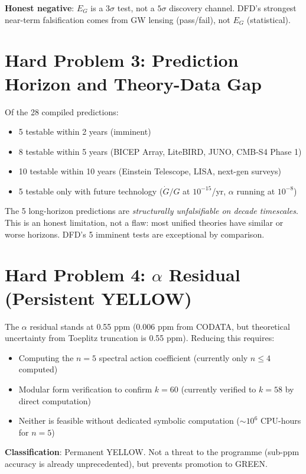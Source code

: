 \documentclass[11pt,a4paper]{article}
\begin{document}
\textbf{Honest negative}: $E_G$ is a $3\sigma$ test, not a $5\sigma$ discovery channel. DFD's strongest near-term falsification comes from GW lensing (pass/fail), not $E_G$ (statistical).

\section{Hard Problem 3: Prediction Horizon and Theory-Data Gap}

Of the 28 compiled predictions:
\begin{itemize}[nosep]
\item 5 testable within 2 years (imminent)
\item 8 testable within 5 years (BICEP Array, LiteBIRD, JUNO, CMB-S4 Phase 1)
\item 10 testable within 10 years (Einstein Telescope, LISA, next-gen surveys)
\item 5 testable only with future technology ($\dot{G}/G$ at $10^{-15}$/yr, $\alpha$ running at $10^{-8}$)
\end{itemize}

The 5 long-horizon predictions are \textit{structurally unfalsifiable on decade timescales}. This is an honest limitation, not a flaw: most unified theories have similar or worse horizons. DFD's 5 imminent tests are exceptional by comparison.

\section{Hard Problem 4: $\alpha$ Residual (Persistent YELLOW)}

The $\alpha$ residual stands at 0.55 ppm (0.006 ppm from CODATA, but theoretical uncertainty from Toeplitz truncation is 0.55 ppm). Reducing this requires:
\begin{itemize}[nosep]
\item Computing the $n = 5$ spectral action coefficient (currently only $n \leq 4$ computed)
\item Modular form verification to confirm $k = 60$ (currently verified to $k = 58$ by direct computation)
\item Neither is feasible without dedicated symbolic computation ($\sim 10^6$ CPU-hours for $n = 5$)
\end{itemize}

\textbf{Classification}: Permanent YELLOW. Not a threat to the programme (sub-ppm accuracy is already unprecedented), but prevents promotion to GREEN.
\end{document}
